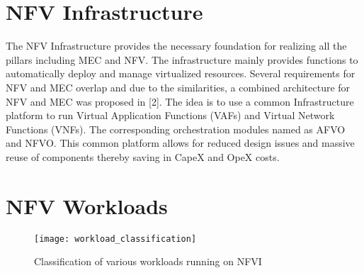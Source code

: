 \section{NFV Infrastructure}

\begin{flushleft}	
The NFV Infrastructure provides the necessary foundation for realizing all the pillars including MEC and NFV. The infrastructure mainly provides functions to automatically deploy and manage virtualized resources. Several requirements for NFV and MEC overlap and due to the similarities, a combined architecture for NFV and MEC was proposed in [2]. The idea is to use a common Infrastructure platform to run Virtual Application Functions (VAFs) and Virtual Network Functions (VNFs). The corresponding orchestration modules named as AFVO and NFVO. This common platform allows for reduced design issues and massive reuse of components thereby saving in CapeX and OpeX costs.
\end{flushleft}

\section{NFV Workloads}

\begin{figure}
    \centering
    \texttt{[image: workload\_classification]}
    \label{fig:figure7}
    \caption{Classification of various workloads running on NFVI}
\end{figure}
